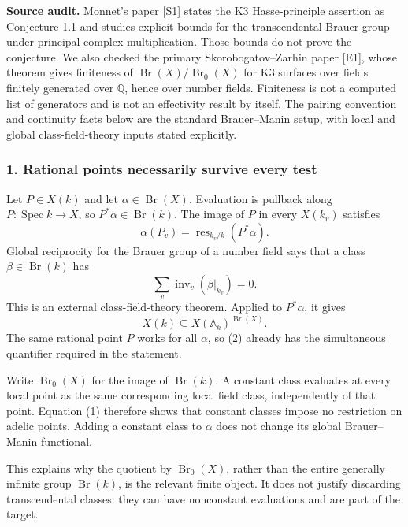 \documentclass[11pt]{article}
\begin{document}
\textbf{Source audit.} Monnet's paper [S1] states the K3 Hasse-principle assertion as Conjecture 1.1 and studies explicit bounds for the transcendental Brauer group under principal complex multiplication. Those bounds do not prove the conjecture. We also checked the primary Skorobogatov--Zarhin paper [E1], whose theorem gives finiteness of $\operatorname{Br}(X)/\operatorname{Br}_0(X)$ for K3 surfaces over fields finitely generated over $\mathbb Q$, hence over number fields. Finiteness is not a computed list of generators and is not an effectivity result by itself. The pairing convention and continuity facts below are the standard Brauer--Manin setup, with local and global class-field-theory inputs stated explicitly.

\subsubsection{1. Rational points necessarily survive every test}
Let $P\in X(k)$ and let $\alpha\in\operatorname{Br}(X)$. Evaluation is pullback along $P:\operatorname{Spec}k\to X$, so $P^*\alpha\in\operatorname{Br}(k)$. The image of $P$ in every $X(k_v)$ satisfies
\[
 \alpha(P_v)=\operatorname{res}_{k_v/k}(P^*\alpha).
\]
Global reciprocity for the Brauer group of a number field says that a class $\beta\in\operatorname{Br}(k)$ has
\[
 \sum_v\operatorname{inv}_v(\beta|_{k_v})=0.            \tag{1}
\]
This is an external class-field-theory theorem. Applied to $P^*\alpha$, it gives
\[
 X(k)\subseteq X(\mathbb A_k)^{\operatorname{Br}(X)}.    \tag{2}
\]
The same rational point $P$ works for all $\alpha$, so (2) already has the simultaneous quantifier required in the statement.

Write $\operatorname{Br}_0(X)$ for the image of $\operatorname{Br}(k)$. A constant class evaluates at every local point as the same corresponding local field class, independently of that point. Equation (1) therefore shows that constant classes impose no restriction on adelic points. Adding a constant class to $\alpha$ does not change its global Brauer--Manin functional.

This explains why the quotient by $\operatorname{Br}_0(X)$, rather than the entire generally infinite group $\operatorname{Br}(k)$, is the relevant finite object. It does not justify discarding transcendental classes: they can have nonconstant evaluations and are part of the target.
\end{document}
